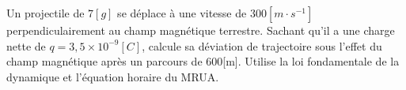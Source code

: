 \begin{exercise}
    Un projectile de \(7[g]\) se déplace à une vitesse de \(300[m \cdot s^{-1}]\) perpendiculairement au champ magnétique terrestre. Sachant qu'il a une charge nette de \(q=3,5 \times 10^{-9} [C]\), calcule sa déviation de trajectoire sous l'effet du champ magnétique après un parcours de 600[m]. Utilise la loi fondamentale de la dynamique et l'équation horaire du MRUA.
\end{exercise}

